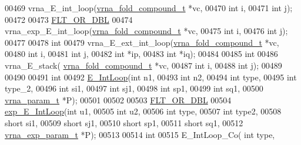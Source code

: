 \begin{DoxyCode}
00469 vrna\_E\_int\_loop(\hyperlink{group__fold__compound_structvrna__fc__s}{vrna\_fold\_compound\_t} *vc,
00470                 \textcolor{keywordtype}{int} i,
00471                 \textcolor{keywordtype}{int} j);
00472 
00473 \hyperlink{group__data__structures_ga31125aeace516926bf7f251f759b6126}{FLT\_OR\_DBL}
00474 vrna\_exp\_E\_int\_loop(\hyperlink{group__fold__compound_structvrna__fc__s}{vrna\_fold\_compound\_t} *vc,
00475                 \textcolor{keywordtype}{int} i,
00476                 \textcolor{keywordtype}{int} j);
00477 
00478 \textcolor{keywordtype}{int}
00479 vrna\_E\_ext\_int\_loop(\hyperlink{group__fold__compound_structvrna__fc__s}{vrna\_fold\_compound\_t} *vc,
00480                     \textcolor{keywordtype}{int} i,
00481                     \textcolor{keywordtype}{int} j,
00482                     \textcolor{keywordtype}{int} *ip,
00483                     \textcolor{keywordtype}{int} *iq);
00484 
00485 \textcolor{keywordtype}{int}
00486 vrna\_E\_stack( \hyperlink{group__fold__compound_structvrna__fc__s}{vrna\_fold\_compound\_t} *vc,
00487               \textcolor{keywordtype}{int} i,
00488               \textcolor{keywordtype}{int} j);
00489 
00490 
00491 \textcolor{keywordtype}{int}
00492 \hyperlink{group__loops_ga0266d2c7a6098259280fb97e9f980b34}{E\_IntLoop}(\textcolor{keywordtype}{int} n1,
00493           \textcolor{keywordtype}{int} n2,
00494           \textcolor{keywordtype}{int} type,
00495           \textcolor{keywordtype}{int} type\_2,
00496           \textcolor{keywordtype}{int} si1,
00497           \textcolor{keywordtype}{int} sj1,
00498           \textcolor{keywordtype}{int} sp1,
00499           \textcolor{keywordtype}{int} sq1,
00500           \hyperlink{group__energy__parameters_structvrna__param__s}{vrna\_param\_t} *P);
00501 
00502 
00503 \hyperlink{group__data__structures_ga31125aeace516926bf7f251f759b6126}{FLT\_OR\_DBL}
00504 \hyperlink{group__loops_ga19f10a6a02bbd07f4cd27b16ac928ea3}{exp\_E\_IntLoop}(\textcolor{keywordtype}{int} u1,
00505               \textcolor{keywordtype}{int} u2,
00506               \textcolor{keywordtype}{int} type,
00507               \textcolor{keywordtype}{int} type2,
00508               \textcolor{keywordtype}{short} si1,
00509               \textcolor{keywordtype}{short} sj1,
00510               \textcolor{keywordtype}{short} sp1,
00511               \textcolor{keywordtype}{short} sq1,
00512               \hyperlink{group__energy__parameters_structvrna__exp__param__s}{vrna\_exp\_param\_t} *P);
00513 
00514 \textcolor{keywordtype}{int}
00515 E\_IntLoop\_Co( \textcolor{keywordtype}{int} type,

\end{DoxyCode}
